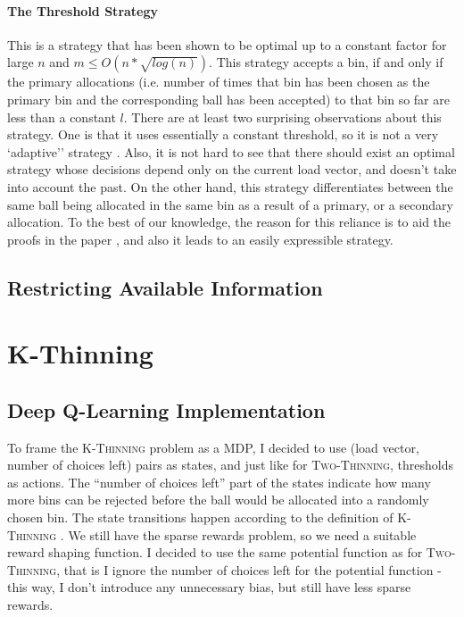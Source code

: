 \paragraph{The Threshold Strategy} 

This is a strategy that has been shown to be optimal \cite{feldheim2021thinning} up to a constant factor for large $n$ and $m\leq O(n*\sqrt{log(n)})$. This strategy accepts a bin, if and only if the primary allocations (i.e. number of times that bin has been chosen as the primary bin and the corresponding ball has been accepted) to that bin so far are less than a constant $l$. There are at least two surprising observations about this strategy. One is that it uses essentially a constant threshold, so it is not a very `adaptive'' strategy . Also, it is not hard to see that there should exist an optimal strategy whose decisions depend only on the current load vector, and doesn't take into account the past. On the other hand, this strategy differentiates between the same ball being allocated in the same bin as a result of a primary, or a secondary allocation. To the best of our knowledge, the reason for this reliance is to aid the proofs in the paper \cite{feldheim2021thinning}, and also it leads to an easily expressible strategy. 


\subsection{Restricting Available Information} \label{lesssharedstate}


\section{K-Thinning}


\subsection{Deep Q-Learning Implementation}


To frame the \textsc{K-Thinning} problem as a MDP, I decided to use (load vector, number of choices left) pairs as states, and just like for \textsc{Two-Thinning}, thresholds as actions. The ``number of choices left'' part of the states indicate how many more bins can be rejected before the ball would be allocated into a randomly chosen bin. The state transitions happen according to the definition of \textsc{K-Thinning} . We still have the sparse rewards problem, so we need a suitable reward shaping function. I decided to use the same potential function as for \textsc{Two-Thinning}, that is I ignore the number of choices left for the potential function - this way, I don't introduce any unnecessary bias, but still have less sparse rewards. 


